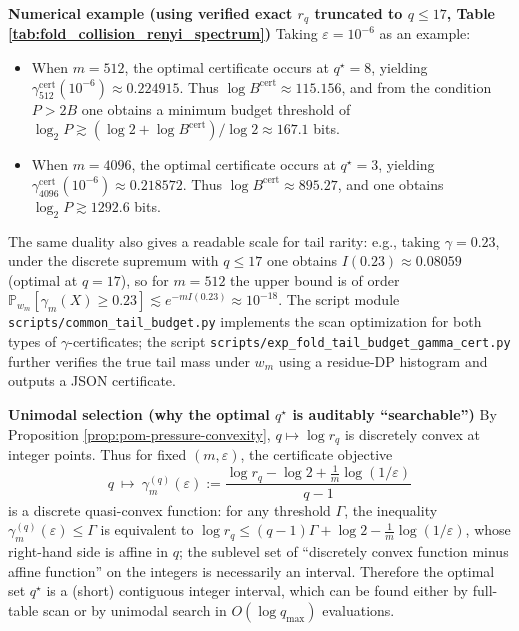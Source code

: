 \begin{remark}
\medskip\noindent\textbf{Numerical example (using verified exact \texorpdfstring{$r_q$}{rq} truncated to \(q\le 17\), Table \ref{tab:fold_collision_renyi_spectrum})}
Taking \(\varepsilon=10^{-6}\) as an example:
\begin{itemize}
  \item When \(m=512\), the optimal certificate occurs at \(q^\star=8\), yielding \(\gamma^{\mathrm{cert}}_{512}(10^{-6})\approx 0.224915\).
  Thus \(\log B^{\mathrm{cert}}\approx 115.156\), and from the condition \(P>2B\) one obtains a minimum budget threshold of
  \(\log_2 P\gtrsim (\log 2+\log B^{\mathrm{cert}})/\log 2\approx 167.1\) bits.
  \item When \(m=4096\), the optimal certificate occurs at \(q^\star=3\), yielding \(\gamma^{\mathrm{cert}}_{4096}(10^{-6})\approx 0.218572\).
  Thus \(\log B^{\mathrm{cert}}\approx 895.27\), and one obtains \(\log_2 P\gtrsim 1292.6\) bits.
\end{itemize}
The same duality also gives a readable scale for tail rarity: e.g., taking \(\gamma=0.23\), under the discrete supremum with \(q\le 17\) one obtains
\(I(0.23)\approx 0.08059\) (optimal at \(q=17\)), so for \(m=512\) the upper bound is of order
\(\mathbb{P}_{w_m}[\gamma_m(X)\ge 0.23]\lesssim e^{-m I(0.23)}\approx 10^{-18}\).
The script module \texttt{scripts/common\_tail\_budget.py} implements the scan optimization for both types of \(\gamma\)-certificates;
the script \texttt{scripts/exp\_fold\_tail\_budget\_gamma\_cert.py} further verifies the true tail mass under \(w_m\) using a residue-DP histogram and outputs a JSON certificate.
\par
\medskip\noindent\textbf{Unimodal selection (why the optimal \(q^\star\) is auditably ``searchable'')}
By Proposition \ref{prop:pom-pressure-convexity}, \(q\mapsto \log r_q\) is discretely convex at integer points.
Thus for fixed \((m,\varepsilon)\), the certificate objective
\[
q\ \longmapsto\ \gamma^{(q)}_{m}(\varepsilon)
:=\frac{\log r_q-\log 2+\frac{1}{m}\log(1/\varepsilon)}{q-1}
\]
is a discrete quasi-convex function: for any threshold \(\Gamma\), the inequality \(\gamma^{(q)}_m(\varepsilon)\le \Gamma\) is equivalent to
\(
\log r_q \le (q-1)\Gamma+\log 2-\frac{1}{m}\log(1/\varepsilon)
\),
whose right-hand side is affine in \(q\); the sublevel set of ``discretely convex function minus affine function'' on the integers is necessarily an interval.
Therefore the optimal set \(q^\star\) is a (short) contiguous integer interval, which can be found either by full-table scan or by unimodal search in \(O(\log q_{\max})\) evaluations.


\end{remark}
